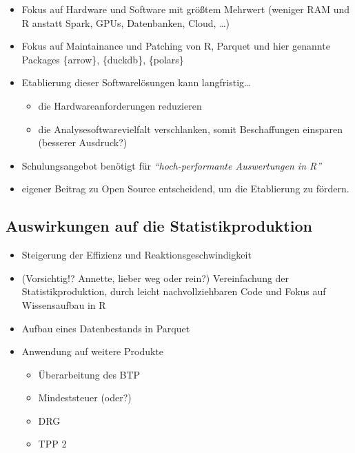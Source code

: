 \documentclass[
  german,
  10pt,
  twoside]{article}
\providecommand{\tightlist}{%
  \setlength{\itemsep}{0pt}\setlength{\parskip}{0pt}}
\begin{document}
\begin{itemize}
\tightlist
\item
  Fokus auf Hardware und Software mit größtem Mehrwert (weniger RAM und
  R anstatt Spark, GPUs, Datenbanken, Cloud, \ldots)
\item
  Fokus auf Maintainance und Patching von R, Parquet und hier genannte
  Packages \{arrow\}, \{duckdb\}, \{polars\}
\item
  Etablierung dieser Softwarelösungen kann langfristig\ldots{}

  \begin{itemize}
  \tightlist
  \item
    die Hardwareanforderungen reduzieren
  \item
    die Analysesoftwarevielfalt verschlanken, somit Beschaffungen
    einsparen (besserer Ausdruck?)
  \end{itemize}
\item
  Schulungsangebot benötigt für \emph{``hoch-performante Auswertungen in
  R''}
\item
  eigener Beitrag zu Open Source entscheidend, um die Etablierung zu
  fördern.
\end{itemize}

\subsection{Auswirkungen auf die
Statistikproduktion}\label{auswirkungen-auf-die-statistikproduktion}

\begin{itemize}
\tightlist
\item
  Steigerung der Effizienz und Reaktionsgeschwindigkeit
\item
  (Vorsichtig!? Annette, lieber weg oder rein?) Vereinfachung der
  Statistikproduktion, durch leicht nachvollziehbaren Code und Fokus auf
  Wissensaufbau in R
\item
  Aufbau eines Datenbestands in Parquet
\item
  Anwendung auf weitere Produkte

  \begin{itemize}
  \tightlist
  \item
    Überarbeitung des BTP
  \item
    Mindeststeuer (oder?)
  \item
    DRG
  \item
    TPP 2
  \end{itemize}
\end{itemize}
\end{document}
